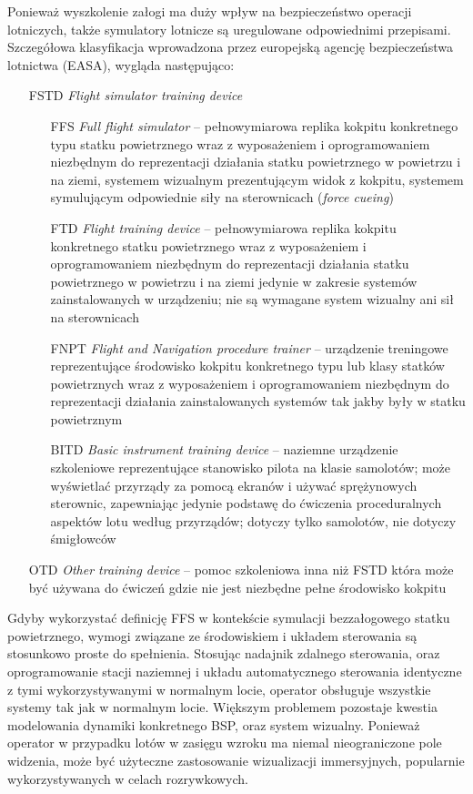 Ponieważ wyszkolenie załogi ma duży wpływ na bezpieczeństwo operacji lotniczych, także symulatory lotnicze są uregulowane odpowiednimi przepisami. Szczegółowa klasyfikacja wprowadzona przez europejską agencję bezpieczeństwa lotnictwa (EASA), wygląda następująco\cite{cs-fstd}:
\begin{itemize}
  \item[FSTD] \emph{Flight simulator training device}
  \begin{itemize}
    \item[FFS] \emph{Full flight simulator} -- pełnowymiarowa replika kokpitu konkretnego typu statku powietrznego wraz z wyposażeniem i oprogramowaniem niezbędnym do reprezentacji działania statku powietrznego w powietrzu i na ziemi, systemem wizualnym prezentującym widok z kokpitu, systemem symulującym odpowiednie siły na sterownicach (\emph{force cueing})
    \item[FTD] \emph{Flight training device} -- pełnowymiarowa replika kokpitu konkretnego statku powietrznego wraz z wyposażeniem i oprogramowaniem niezbędnym do reprezentacji działania statku powietrznego w powietrzu i na ziemi jedynie w zakresie systemów zainstalowanych w urządzeniu; nie są wymagane system wizualny ani sił na sterownicach
    \item[FNPT] \emph{Flight and Navigation procedure trainer} -- urządzenie treningowe reprezentujące środowisko kokpitu konkretnego typu lub klasy statków powietrznych wraz z wyposażeniem i oprogramowaniem niezbędnym do reprezentacji działania zainstalowanych systemów tak jakby były w statku powietrznym
    \item[BITD] \emph{Basic instrument training device} -- naziemne urządzenie szkoleniowe reprezentujące stanowisko pilota na klasie samolotów; może wyświetlać przyrządy za pomocą ekranów i używać sprężynowych sterownic, zapewniając jedynie podstawę do ćwiczenia proceduralnych aspektów lotu według przyrządów; dotyczy tylko samolotów, nie dotyczy śmigłowców
  \end{itemize} 
  \item[OTD] \emph{Other training device} -- pomoc szkoleniowa inna niż FSTD która może być używana do ćwiczeń gdzie nie jest niezbędne pełne środowisko kokpitu
\end{itemize}

Gdyby wykorzystać definicję FFS w kontekście symulacji bezzałogowego statku powietrznego, wymogi związane ze środowiskiem i układem sterowania są stosunkowo proste do spełnienia. Stosując nadajnik zdalnego sterowania, oraz oprogramowanie stacji naziemnej i układu automatycznego sterowania identyczne z tymi wykorzystywanymi w normalnym locie, operator obsługuje wszystkie systemy tak jak w normalnym locie. Większym problemem pozostaje kwestia modelowania dynamiki konkretnego BSP, oraz system wizualny. Ponieważ operator w przypadku lotów w zasięgu wzroku ma niemal nieograniczone pole widzenia, może być użyteczne zastosowanie wizualizacji immersyjnych, popularnie wykorzystywanych w celach rozrywkowych.

